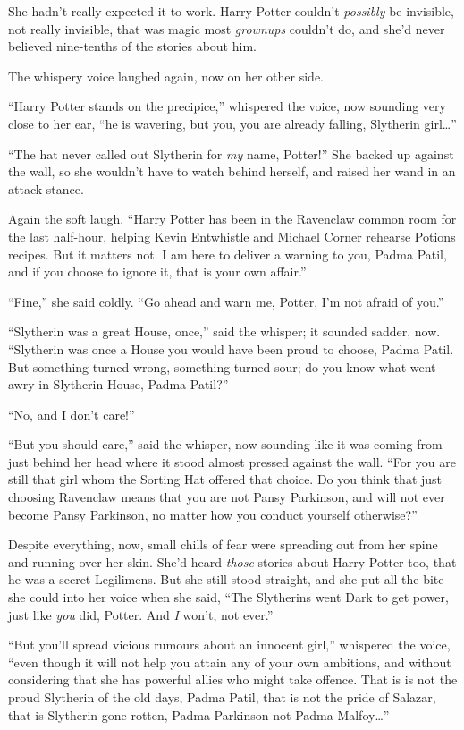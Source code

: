 She hadn't really expected it to work. Harry Potter couldn't
\emph{possibly} be invisible, not really invisible, that was magic most
\emph{grownups} couldn't do, and she'd never believed nine-tenths of the
stories about him.

The whispery voice laughed again, now on her other side.

``Harry Potter stands on the precipice,'' whispered the voice, now
sounding very close to her ear, ``he is wavering, but you, you are
already falling, Slytherin girl\ldots{}''

``The hat never called out Slytherin for \emph{my} name, Potter!'' She
backed up against the wall, so she wouldn't have to watch behind
herself, and raised her wand in an attack stance.

Again the soft laugh. ``Harry Potter has been in the Ravenclaw common
room for the last half-hour, helping Kevin Entwhistle and Michael Corner
rehearse Potions recipes. But it matters not. I am here to deliver a
warning to you, Padma Patil, and if you choose to ignore it, that is
your own affair.''

``Fine,'' she said coldly. ``Go ahead and warn me, Potter, I'm not
afraid of you.''

``Slytherin was a great House, once,'' said the whisper; it sounded
sadder, now. ``Slytherin was once a House you would have been proud to
choose, Padma Patil. But something turned wrong, something turned sour;
do you know what went awry in Slytherin House, Padma Patil?''

``No, and I don't care!''

``But you should care,'' said the whisper, now sounding like it was
coming from just behind her head where it stood almost pressed against
the wall. ``For you are still that girl whom the Sorting Hat offered
that choice. Do you think that just choosing Ravenclaw means that you
are not Pansy Parkinson, and will not ever become Pansy Parkinson, no
matter how you conduct yourself otherwise?''

Despite everything, now, small chills of fear were spreading out from
her spine and running over her skin. She'd heard \emph{those} stories
about Harry Potter too, that he was a secret Legilimens. But she still
stood straight, and she put all the bite she could into her voice when
she said, ``The Slytherins went Dark to get power, just like \emph{you}
did, Potter. And \emph{I} won't, not ever.''

``But you'll spread vicious rumours about an innocent girl,'' whispered
the voice, ``even though it will not help you attain any of your own
ambitions, and without considering that she has powerful allies who
might take offence. That is is not the proud Slytherin of the old days,
Padma Patil, that is not the pride of Salazar, that is Slytherin gone
rotten, Padma Parkinson not Padma Malfoy\ldots{}''

